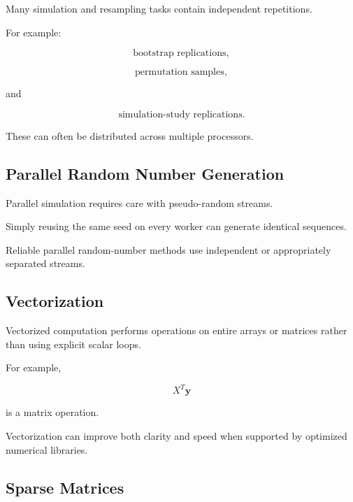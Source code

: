 Many simulation and resampling tasks contain independent repetitions.

For example:

\[
\boxed{
\text{bootstrap replications},
}
\]

\[
\boxed{
\text{permutation samples},
}
\]

and

\[
\boxed{
\text{simulation-study replications}.
}
\]

These can often be distributed across multiple processors.

\subsection{Parallel Random Number Generation}
\label{subsec:parallel-random-number-generation}

Parallel simulation requires care with pseudo-random streams.

Simply reusing the same seed on every worker can generate identical
sequences.

Reliable parallel random-number methods use independent or appropriately
separated streams.

\subsection{Vectorization}
\label{subsec:vectorization-statistics}

Vectorized computation performs operations on entire arrays or matrices
rather than using explicit scalar loops.

For example,

\[
\boxed{
X^T\mathbf{y}
}
\]

is a matrix operation.

Vectorization can improve both clarity and speed when supported by
optimized numerical libraries.

\subsection{Sparse Matrices}
\label{subsec:sparse-matrices-statistics}

